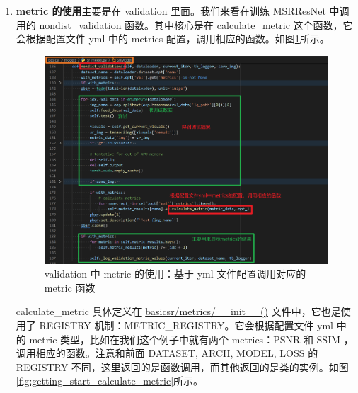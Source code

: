 \documentclass[../main.tex]{subfiles}
\begin{document}
\begin{enumerate}
\begin{enumerate}
              \item \textbf{metric 的使用}主要是在 validation 里面。我们来看在训练 MSRResNet 中调用的 nondist\_validation 函数。其中核心是在 calculate\_metric 这个函数，它会根据配置文件 yml 中的 metrics 配置，调用相应的函数。如图\ref{fig:getting_start_validation_metric}所示。

                    \begin{figure}[h]
                        \begin{center}
                            \vspace{-0.2cm}
                            \includegraphics[width=0.85\linewidth]{figures/getting_start_validation_metric.png}
                            \vspace{-0.3cm}
                            \caption{validation 中 metric 的使用：基于 yml 文件配置调用对应的 metric 函数}
                            \label{fig:getting_start_validation_metric}
                        \end{center}
                        \vspace{-0.5cm}
                    \end{figure}

                    calculate\_metric 具体定义在 \href{https://github.com/XPixelGroup/BasicSR/blob/master/basicsr/metrics/\_\_init\_\_.py}{basicsr/metrics/\_\_init\_\_()} 文件中，它也是使用了 REGISTRY 机制：METRIC\_REGISTRY。它会根据配置文件 yml 中的 metric 类型，比如在我们这个例子中就有两个 metrics：PSNR 和 SSIM ，调用相应的函数。注意和前面 DATASET, ARCH, MODEL, LOSS 的 REGISTRY 不同，这里返回的是函数调用，而其他返回的是类的实例。如图\ref{fig:getting_start_calculate_metric}所示。


\end{enumerate}
\end{enumerate}
\end{document}
